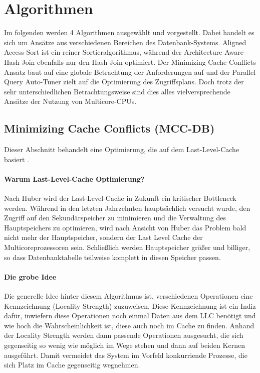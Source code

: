 \chapter{Algorithmen}
\label{sec:Algorithmen}
Im folgenden werden 4 Algorithmen ausgewählt und vorgestellt. Dabei handelt es sich um Ansätze aus verschiedenen Bereichen des Datenbank-Systems. Aligned Access-Sort ist ein reiner Sortieralgorithmus, während der Architecture Aware-Hash Join ebenfalls nur den Hash Join optimiert. Der Minimizing Cache Conflicts Ansatz baut auf eine globale Betrachtung der Anforderungen auf und der Parallel Query Auto-Tuner zielt auf die Optimierung des Zugriffsplans. Doch trotz der sehr unterschiedlichen Betrachtungsweise sind dies alles vielversprechende Ansätze der Nutzung von Multicore-CPUs.


\section{Minimizing Cache Conflicts (MCC-DB)}
\label{sec:MCC-DB}
Dieser Abschnitt behandelt eine Optimierung, die auf dem Last-Level-Cache basiert \cite{LEE}. 

\subsubsection*{Warum Last-Level-Cache Optimierung?}
Nach Huber \cite{HUBER} wird der Last-Level-Cache in Zukunft ein kritischer Bottleneck werden. Während in den letzten Jahrzehnten hauptsächlich versucht wurde, den Zugriff auf den Sekundärspeicher zu minimieren und die Verwaltung des Hauptspeichers zu optimieren, wird nach Ansicht von Huber das Problem bald nicht mehr der Hauptspeicher, sondern der Last Level Cache der Multicoreprozessoren sein. Schließlich werden Hauptspeicher größer und billiger, so dass Datenbanktabelle teilweise komplett in diesen Speicher passen.

\subsubsection*{Die grobe Idee}
Die generelle Idee hinter diesem Algorithmus ist, verschiedenen Operationen eine Kennzeichnung (Locality Strength) zuzuweisen. Diese Kennzeichnung ist ein Indiz dafür, inwiefern diese Operationen noch einmal Daten aus dem LLC benötigt und wie hoch die Wahrscheinlichkeit ist, diese auch noch im Cache zu finden. Anhand der Locality Strength werden dann passende Operationen ausgesucht, die sich gegenseitig so wenig wie möglich im Wege stehen und dann auf beiden Kernen ausgeführt. Damit vermeidet das System im Vorfeld konkurriende Prozesse, die sich Platz im Cache gegenseitig wegnehmen.

